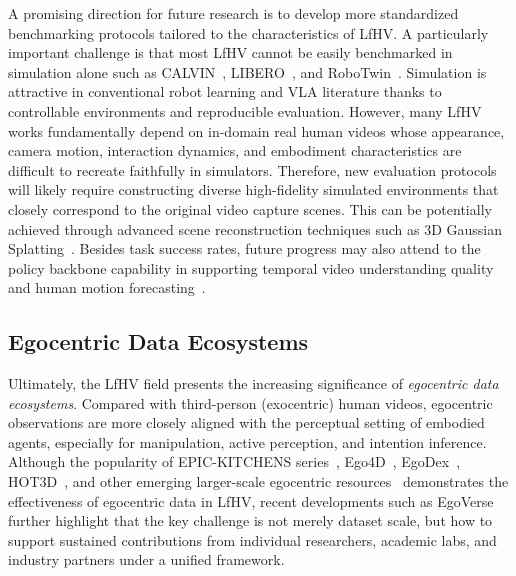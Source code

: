 \documentclass[Afour,sageh,times]{sagej}
\begin{document}
A promising direction for future research is to develop more standardized benchmarking protocols tailored to the characteristics of LfHV. A particularly important challenge is that most LfHV cannot be easily benchmarked in simulation alone such as CALVIN~\citep{mees2022calvin}, LIBERO~\citep{liu2023libero}, and RoboTwin~\citep{mu2025robotwin}. Simulation is attractive in conventional robot learning and VLA literature thanks to controllable environments and reproducible evaluation. However, many LfHV works fundamentally depend on in-domain real human videos whose appearance, camera motion, interaction dynamics, and embodiment characteristics are difficult to recreate faithfully in simulators. Therefore, new evaluation protocols will likely require constructing diverse high-fidelity simulated environments that closely correspond to the original video capture scenes. This can be potentially achieved through advanced scene reconstruction techniques such as 3D Gaussian Splatting~\citep{kerbl20233d}. Besides task success rates, future progress may also attend to the policy backbone capability in supporting temporal video understanding quality~\citep{lin2025physbrain,zhang2025zero} and human motion forecasting~\citep{ma2025novel,chen2025flowing}.

\subsection{Egocentric Data Ecosystems}

Ultimately, the LfHV field presents the increasing significance of \textit{egocentric data ecosystems}. Compared with third-person (exocentric) human videos, egocentric observations are more closely aligned with the perceptual setting of embodied agents, especially for manipulation, active perception, and intention inference. Although the popularity of EPIC-KITCHENS series~\citep{damen2018scaling,damen2020rescaling}, Ego4D~\citep{grauman2022ego4d}, EgoDex~\citep{hoque2025egodex}, HOT3D~\citep{banerjee2024hot3d}, and other emerging larger-scale egocentric resources~\citep{li2026egolive} demonstrates the effectiveness of egocentric data in LfHV, recent developments such as EgoVerse~\citep{punamiya2026egoverse} further highlight that the key challenge is not merely dataset scale, but how to support sustained contributions from individual researchers, academic labs, and industry partners under a unified framework.
\end{document}
